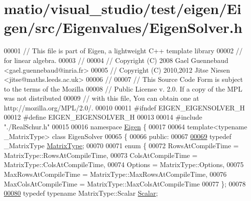 \hypertarget{matio_2visual__studio_2test_2eigen_2_eigen_2src_2_eigenvalues_2_eigen_solver_8h_source}{}\section{matio/visual\+\_\+studio/test/eigen/\+Eigen/src/\+Eigenvalues/\+Eigen\+Solver.h}
\label{matio_2visual__studio_2test_2eigen_2_eigen_2src_2_eigenvalues_2_eigen_solver_8h_source}

\begin{DoxyCode}
00001 \textcolor{comment}{// This file is part of Eigen, a lightweight C++ template library}
00002 \textcolor{comment}{// for linear algebra.}
00003 \textcolor{comment}{//}
00004 \textcolor{comment}{// Copyright (C) 2008 Gael Guennebaud <gael.guennebaud@inria.fr>}
00005 \textcolor{comment}{// Copyright (C) 2010,2012 Jitse Niesen <jitse@maths.leeds.ac.uk>}
00006 \textcolor{comment}{//}
00007 \textcolor{comment}{// This Source Code Form is subject to the terms of the Mozilla}
00008 \textcolor{comment}{// Public License v. 2.0. If a copy of the MPL was not distributed}
00009 \textcolor{comment}{// with this file, You can obtain one at http://mozilla.org/MPL/2.0/.}
00010 
00011 \textcolor{preprocessor}{#ifndef EIGEN\_EIGENSOLVER\_H}
00012 \textcolor{preprocessor}{#define EIGEN\_EIGENSOLVER\_H}
00013 
00014 \textcolor{preprocessor}{#include "./RealSchur.h"}
00015 
00016 \textcolor{keyword}{namespace }\hyperlink{namespace_eigen}{Eigen} \{ 
00017 
00064 \textcolor{keyword}{template}<\textcolor{keyword}{typename} \_MatrixType> \textcolor{keyword}{class }EigenSolver
00065 \{
00066   \textcolor{keyword}{public}:
00067 
\hyperlink{group___eigenvalues___module_a83acd180404ddaac8a678fa65a6b632b}{00069}     \textcolor{keyword}{typedef} \_MatrixType \hyperlink{group___eigenvalues___module_a83acd180404ddaac8a678fa65a6b632b}{MatrixType};
00070 
00071     \textcolor{keyword}{enum} \{
00072       RowsAtCompileTime = MatrixType::RowsAtCompileTime,
00073       ColsAtCompileTime = MatrixType::ColsAtCompileTime,
00074       Options = MatrixType::Options,
00075       MaxRowsAtCompileTime = MatrixType::MaxRowsAtCompileTime,
00076       MaxColsAtCompileTime = MatrixType::MaxColsAtCompileTime
00077     \};
00078 
\hyperlink{group___eigenvalues___module_a017d49fe0d59874b70a2fcf35e5aa373}{00080}     \textcolor{keyword}{typedef} \textcolor{keyword}{typename} MatrixType::Scalar \hyperlink{group___eigenvalues___module_a017d49fe0d59874b70a2fcf35e5aa373}{Scalar};

\end{DoxyCode}
